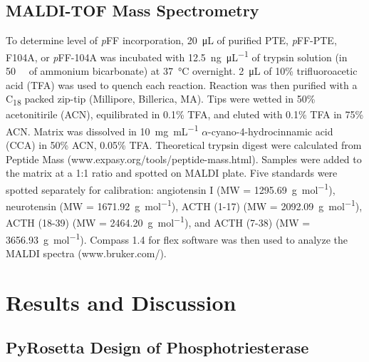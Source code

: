 \begin{refsection}
\subsection{MALDI-TOF Mass Spectrometry}

To determine level of \emph{p}FF incorporation, \SI{20}{\micro\liter} of
purified PTE, \emph{p}FF-PTE, F104A, or \emph{p}FF-104A was incubated with
\SI{12.5}{\ng\per\uL} of trypsin solution (in \SI{50}{\milli\Molar} of ammonium
bicarbonate) at \SI{37}{\celsius} overnight. \SI{2}{\uL} of 10\%
trifluoroacetic acid (TFA) was used to quench each reaction. Reaction was then
purified with a C\textsubscript{18} packed zip-tip (Millipore, Billerica, MA).
Tips were wetted in 50\% acetonitirile (ACN), equilibrated in 0.1\% TFA, and
eluted with 0.1\% TFA in 75\% ACN. Matrix was dissolved in \SI{10}{\mg\per\mL}
$\alpha$-cyano-4-hydrocinnamic acid (CCA) in 50\% ACN, 0.05\% TFA. Theoretical
trypsin digest were calculated from Peptide Mass
(www.expasy.org/tools/peptide-mass.html). Samples were added to the matrix at a
1:1 ratio and spotted on MALDI plate. Five standards were spotted separately
for calibration: angiotensin I (MW = \SI{1295.69}{\g\per\mole}), neurotensin
(MW = \SI{1671.92}{\g\per\mole}), ACTH (1-17) (MW = \SI{2092.09}{\g\per\mole}),
ACTH (18-39) (MW = \SI{2464.20}{\g\per\mole}), and ACTH (7-38) (MW =
\SI{3656.93}{\g\per\mole}).  Compass 1.4 for flex software was then used to
analyze the MALDI spectra (www.bruker.com/).

\section{Results and Discussion}

\subsection{PyRosetta Design of Phosphotriesterase}


\end{refsection}
